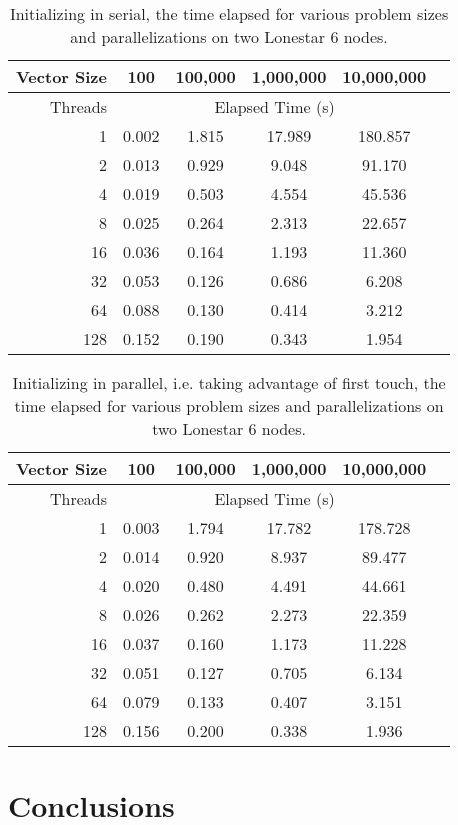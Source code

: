 \documentclass{article}
\begin{document}
\begin{table}[h!]
	\centering
	\caption{Initializing in serial, the time elapsed for various problem sizes and parallelizations on two Lonestar 6 nodes.}
	\label{tbl:serial-init2}
	\begin{tabular}{r|ccccc}
		Vector Size & 100 & 100,000 & 1,000,000 & 10,000,000 \\
		\hline
		Threads & \multicolumn{4}{c}{Elapsed Time (s)} \\
		\hline
		1 & 0.002 & 1.815 & 17.989 & 180.857 \\
		2 & 0.013 & 0.929 & 9.048 & 91.170 \\
		4 & 0.019 & 0.503 & 4.554 & 45.536 \\
		8 & 0.025 & 0.264 & 2.313 & 22.657 \\
		16 & 0.036 & 0.164 & 1.193 & 11.360 \\
		32 & 0.053 & 0.126 & 0.686 & 6.208 \\
		64 & 0.088 & 0.130 & 0.414 & 3.212 \\
		128 & 0.152 & 0.190 & 0.343 & 1.954
	\end{tabular}
\end{table}

\begin{table}[h!]
	\centering
	\caption{Initializing in parallel, i.e. taking advantage of first touch, the time elapsed for various problem sizes and parallelizations on two Lonestar 6 nodes.}
	\label{tbl:parallel-init2}
	\begin{tabular}{r|ccccc}
		Vector Size & 100 & 100,000 & 1,000,000 & 10,000,000 \\
		\hline
		Threads & \multicolumn{4}{c}{Elapsed Time (s)} \\
		\hline
		1 & 0.003 & 1.794 & 17.782 & 178.728 \\
		2 & 0.014 & 0.920 & 8.937 & 89.477 \\
		4 & 0.020 & 0.480 & 4.491 & 44.661 \\
		8 & 0.026 & 0.262 & 2.273 & 22.359 \\
		16 & 0.037 & 0.160 & 1.173 & 11.228 \\
		32 & 0.051 & 0.127 & 0.705 & 6.134 \\
		64 & 0.079 & 0.133 & 0.407 & 3.151 \\
		128 & 0.156 & 0.200 & 0.338 & 1.936 \\
	\end{tabular}
\end{table}

\section{Conclusions}
\end{document}
